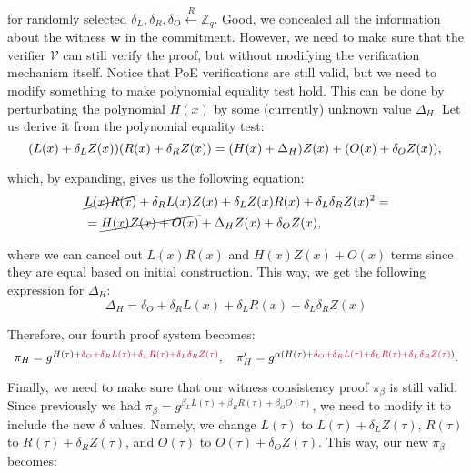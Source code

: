 \documentclass[../lecture-notes-148x210.tex]{subfiles}
\begin{document}
for randomly selected $\delta_L, \delta_R, \delta_O \xleftarrow{R} \mathbb{Z}_q$. Good, we concealed all the information about the witness $\mathbf{w}$ in the commitment. However, we need to make sure that the verifier $\mathcal{V}$ can still verify the proof, but without modifying the verification mechanism itself. Notice that PoE verifications are still valid, but we need to modify something to make polynomial equality test hold. This can be done by perturbating the polynomial $H(x)$ by some (currently) unknown value $\Delta_H$. Let us derive it from the polynomial equality test:
\begin{equation*}
    (L(x) + \delta_L Z(x))(R(x) + \delta_R Z(x)) = (H(x) + \Delta_H)Z(x) + (O(x) + \delta_O Z(x)), \\
\end{equation*}

which, by expanding, gives us the following equation:
\begin{equation*}
    \begin{aligned}
        &\cancel{L(x)R(x)} + \delta_R L(x)Z(x) + \delta_L Z(x)R(x) + \delta_L \delta_R Z(x)^2 = \\ 
        &= \cancel{H(x)Z(x) + O(x)} + \Delta_HZ(x) + \delta_O Z(x), \\
    \end{aligned}
\end{equation*}

where we can cancel out $L(x)R(x)$ and $H(x)Z(x) + O(x)$ terms since they are equal based on initial construction. This way, we get the following expression for $\Delta_H$:
\begin{equation*}
    \Delta_H = \delta_O + \delta_R L(x) + \delta_L R(x) + \delta_L \delta_R Z(x)
\end{equation*}

Therefore, our fourth proof system becomes:
\begin{equation*}
    \scalebox{0.95}{$
    \pi_H = g^{H(\tau) + \textcolor{purple}{\delta_O + \delta_R L(\tau) + \delta_L R(\tau) + \delta_L \delta_R Z(\tau)}}, \quad \pi_H' = g^{\alpha(H(\tau) + \textcolor{purple}{\delta_O + \delta_R L(\tau) + \delta_L R(\tau) + \delta_L \delta_R Z(\tau)})}.
    $}
\end{equation*}

Finally, we need to make sure that our witness consistency proof $\pi_{\beta}$ is still valid. Since previously we had $\pi_{\beta} = g^{\beta_LL(\tau) + \beta_RR(\tau) + \beta_OO(\tau)}$, we need to modify it to include the new $\delta$ values. Namely, we change $L(\tau)$ to $L(\tau)+\delta_LZ(\tau)$, $R(\tau)$ to $R(\tau)+\delta_RZ(\tau)$, and $O(\tau)$ to $O(\tau)+\delta_OZ(\tau)$. This way, our new $\pi_{\beta}$ becomes:
\end{document}
